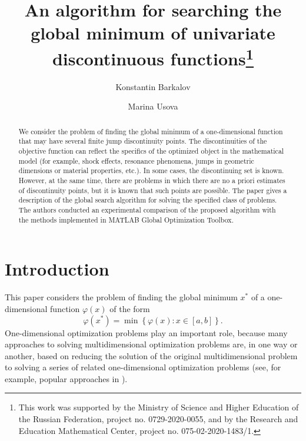 \documentclass[runningheads]{llncs}
\begin{document}
%
\title{An algorithm for searching the global minimum of univariate discontinuous functions\thanks{This work was supported by the Ministry of Science and Higher Education of the Russian Federation, project no. 0729-2020-0055, and by the Research and Education Mathematical Center, project no. 075-02-2020-1483/1.}}
%
%
\author{Konstantin Barkalov %
\and Marina Usova %
}
%
%
%
\maketitle              %
%
\begin{abstract}
We consider the problem of finding the global minimum of a one-dimensional function that may have several finite jump discontinuity points. The discontinuities of the objective function can reflect the specifics of the optimized object in the mathematical model (for example, shock effects, resonance phenomena, jumps in geometric dimensions or material properties, etc.). In some cases, the discontinuing set is known. However, at the same time, there are problems in which there are no a priori estimates of discontinuity points, but it is known that such points are possible. The paper gives a description of the global search algorithm for solving the specified class of problems. The authors conducted an experimental comparison of the proposed algorithm with the methods implemented in MATLAB Global Optimization Toolbox.


\end{abstract}
%
%
%
\section{Introduction}

This paper considers the problem of finding the global minimum $x^*$ of a one-dimensional function $\varphi(x)$ of the form 
\begin{equation}\label{problem}
\varphi(x^*)=\min\left\{\varphi(x):x\in\left[a,b\right]\right\}.
\end{equation}
One-dimensional optimization problems play an important role, because many approaches to solving multidimensional optimization problems are, in one way or another, based on reducing the solution of the original multidimensional problem to solving a series of related one-dimensional optimization problems (see, for example, popular approaches in \cite{PaulaviciusZilinskas2014,Sergeyev2017,Sergeyev2013}).
\end{document}
